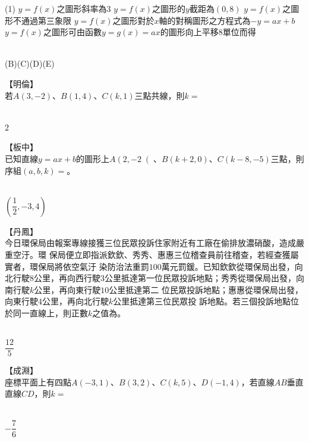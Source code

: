 \documentclass
[answers]
{exam}
\newcommand\ul[1]{\uline{\hspace*{#1}}}
\theoremstyle{definition}
\begin{document}
\begin{questions}
\begin{tasks}(1)
	\task $y=f(x)$之圖形斜率為$3$
	\task $y=f(x)$之圖形的$y$截距為$\left( 0,8\right)$
	\task $y=f(x)$之圖形不通過第三象限
	\task $y=f(x)$之圖形對於$x$軸的對稱圖形之方程式為$-y=ax+b$
	\task $y=f(x)$之圖形可由函數$y=g(x)=ax$的圖形向上平移$8$單位而得
\end{tasks}

\begin{solution}~\\
	(B)(C)(D)(E)
\end{solution}

\question
【明倫】\\
若$A\left( 3,-2\right)$、$B\left( 1,4\right)$、$C\left( k,1\right)$三點共線，則$k=$\ul{50pt}
\begin{solution}~\\
	$2$
\end{solution}

\question
【板中】\\
已知直線$y=ax+b$的圖形上$A\left( 2,-2\right($、$B\left(k+2,0\right)$、$C\left(k-8,-5\right)$三點，則序組$\left( a,b,k \right) =$\ul{50pt}。
\begin{solution}~\\
	$\left(  \dfrac{1}{2},-3,4  \right)$
\end{solution}

\question
【丹鳳】\\
今日環保局由報案專線接獲三位民眾投訴住家附近有工廠在偷排放濃硝酸，造成嚴重空汙。環
保局便立即指派欽欽、秀秀、惠惠三位稽查員前往稽查，若經查獲屬實者，環保局將依空氣汙
染防治法重罰$100$萬元罰鍰。已知欽欽從環保局出發，向北行駛$8$公里，再向西行駛$3$公里抵達第一位民眾投訴地點；秀秀從環保局出發，向南行駛$k$公里，再向東行駛$10$公里抵達第二
位民眾投訴地點；惠惠從環保局出發，向東行駛$4$公里，再向北行駛$k$公里抵達第三位民眾投
訴地點。若三個投訴地點位於同一直線上，則正數$k$之值為\ul{50pt}。
\begin{solution}~\\
	$\dfrac{12}{5}$
\end{solution}


\question
【成淵】\\
座標平面上有四點$A\left(-3,1\right)$、$B\left(3,2 \right)$、$C\left( k,5 \right)$、$D\left( -1,4\right)$，若直線$AB$垂直直線$CD$，則$k=$\ul{50pt}
\begin{solution}~\\
	$-\dfrac{7}{6}$
\end{solution}


\end{questions}
\end{document}
